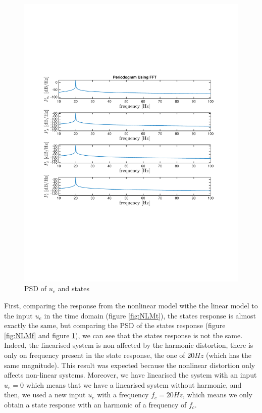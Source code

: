 \begin{figure}[H]
 \centering 
\includegraphics[trim=2cm 7cm 2cm 7cm, clip=true, totalheight=0.35\textheight, angle=0]{figures/p9freq.pdf}
\caption{PSD of $u_e$ and states}
\label{fig:responseLMf}
\end{figure}

First, comparing the response from the nonlinear model withe the linear model to the input $u_e$ in the time domain (figure \ref{fig:NLMt}), the states response is almost exactly the same, but comparing the PSD of the states response (figure \ref{fig:NLMf} and figure \ref{fig:responseLMf}), we can see that the states response is not the same. Indeed, the linearised system is non affected by the harmonic distortion, there is only on frequency present in the state response, the one of 20$Hz$ (which has the same magnitude).
This result was expected because the nonlinear distortion only affects non-linear systems. Moreover, we have linearised the system with an input $u_e=0$ which means that we have a linearised system without harmonic, and then, we used a new input $u_e$ with a frequency $f_c=20Hz$, which means we only obtain a state response with an harmonic of a frequency of $f_c$.





